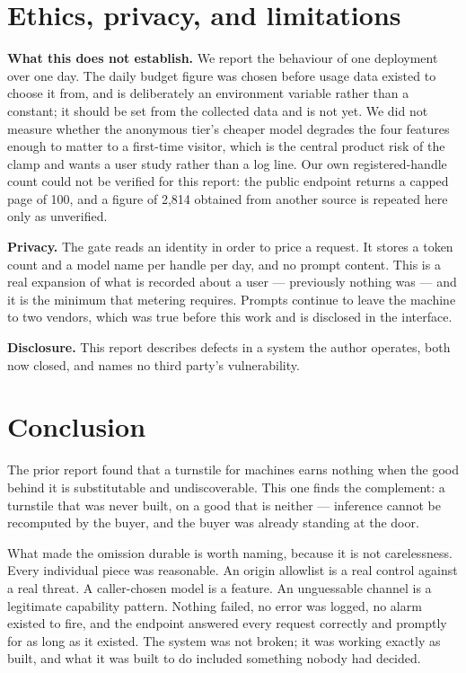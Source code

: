 \documentclass[10pt,letterpaper,twocolumn]{article}
\begin{document}
\section{Ethics, privacy, and limitations}
\label{sec:limits}

\textbf{What this does not establish.} We report the behaviour of one deployment
over one day. The daily budget figure was chosen before usage data existed to
choose it from, and is deliberately an environment variable rather than a
constant; it should be set from the collected data and is not yet. We did not
measure whether the anonymous tier's cheaper model degrades the four features
enough to matter to a first-time visitor, which is the central product risk of
the clamp and wants a user study rather than a log line. Our own registered-handle
count could not be verified for this report: the public endpoint returns a capped
page of 100, and a figure of 2,814 obtained from another source is repeated here
only as unverified.

\textbf{Privacy.} The gate reads an identity in order to price a request. It
stores a token count and a model name per handle per day, and no prompt content.
This is a real expansion of what is recorded about a user --- previously nothing
was --- and it is the minimum that metering requires. Prompts continue to leave
the machine to two vendors, which was true before this work and is disclosed in
the interface.

\textbf{Disclosure.} This report describes defects in a system the author
operates, both now closed, and names no third party's vulnerability.

\section{Conclusion}
\label{sec:conclusion}

The prior report found that a turnstile for machines earns nothing when the good
behind it is substitutable and undiscoverable. This one finds the complement: a
turnstile that was never built, on a good that is neither --- inference cannot be
recomputed by the buyer, and the buyer was already standing at the door.

What made the omission durable is worth naming, because it is not carelessness.
Every individual piece was reasonable. An origin allowlist is a real control
against a real threat. A caller-chosen model is a feature. An unguessable channel
is a legitimate capability pattern. Nothing failed, no error was logged, no
alarm existed to fire, and the endpoint answered every request correctly and
promptly for as long as it existed. The system was not broken; it was working
exactly as built, and what it was built to do included something nobody had
decided.
\end{document}
